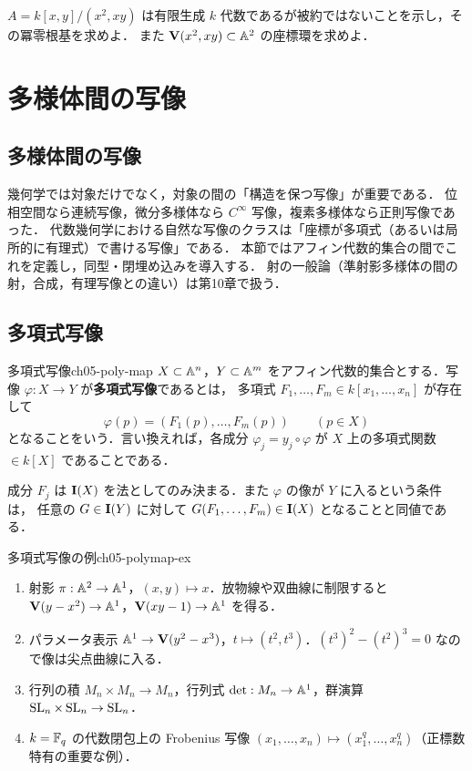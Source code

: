 $A=k[x,y]/(x^2,xy)$ は有限生成 $k$ 代数であるが被約ではないことを示し，その冪零根基を求めよ．
また $\mathbf{V}(x^2,xy)\subset\mathbb{A}^2$ の座標環を求めよ．

\section{多様体間の写像}

\subsection{多様体間の写像}

幾何学では対象だけでなく，対象の間の「構造を保つ写像」が重要である．
位相空間なら連続写像，微分多様体なら $C^\infty$ 写像，複素多様体なら正則写像であった．
代数幾何学における自然な写像のクラスは「座標が多項式（あるいは局所的に有理式）で書ける写像」である．
本節ではアフィン代数的集合の間でこれを定義し，同型・閉埋め込みを導入する．
射の一般論（準射影多様体の間の射，合成，有理写像との違い）は第10章で扱う．

\subsection{多項式写像}

\begin{mydef}{多項式写像}{ch05-poly-map}
$X\subset\mathbb{A}^n$，$Y\subset\mathbb{A}^m$ をアフィン代数的集合とする．写像 $\varphi:X\to Y$ が\textbf{多項式写像}であるとは，
多項式 $F_1,\dots,F_m\in k[x_1,\dots,x_n]$ が存在して
\[
  \varphi(p)=(F_1(p),\dots,F_m(p))\qquad(p\in X)
\]
となることをいう．言い換えれば，各成分 $\varphi_j=y_j\circ\varphi$ が $X$ 上の多項式関数 $\in k[X]$ であることである．
\end{mydef}

成分 $F_j$ は $\mathbf{I}(X)$ を法としてのみ決まる．また $\varphi$ の像が $Y$ に入るという条件は，
任意の $G\in\mathbf{I}(Y)$ に対して $G(F_1,\dots,F_m)\in\mathbf{I}(X)$ となることと同値である．

\begin{myex}{多項式写像の例}{ch05-polymap-ex}
\begin{enumerate}
  \item 射影 $\pi:\mathbb{A}^2\to\mathbb{A}^1$，$(x,y)\mapsto x$．放物線や双曲線に制限すると $\mathbf{V}(y-x^2)\to\mathbb{A}^1$，$\mathbf{V}(xy-1)\to\mathbb{A}^1$ を得る．
  \item パラメータ表示 $\mathbb{A}^1\to\mathbf{V}(y^2-x^3)$，$t\mapsto(t^2,t^3)$．$(t^3)^2-(t^2)^3=0$ なので像は尖点曲線に入る．
  \item 行列の積 $M_n\times M_n\to M_n$，行列式 $\det:M_n\to\mathbb{A}^1$，群演算 $\operatorname{SL}_n\times\operatorname{SL}_n\to\operatorname{SL}_n$．
  \item $k=\mathbb{F}_q$ の代数閉包上の Frobenius 写像 $(x_1,\dots,x_n)\mapsto(x_1^q,\dots,x_n^q)$（正標数特有の重要な例）．
\end{enumerate}
\end{myex}

